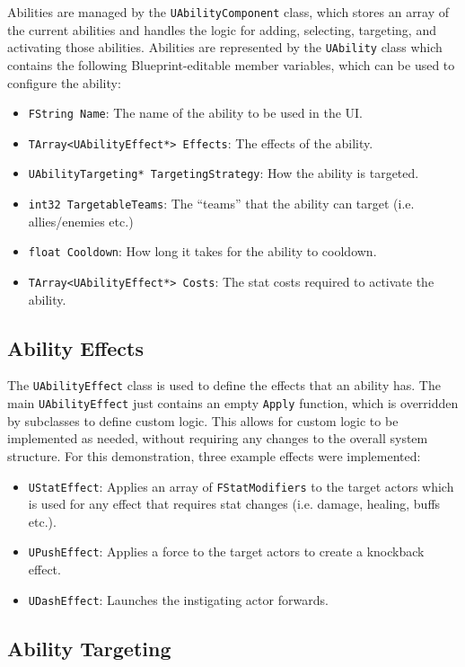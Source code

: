 \documentclass{article}
\begin{document}
Abilities are managed by the \texttt{UAbilityComponent} class, which stores an array of the current abilities and handles the logic for adding, selecting, targeting, and activating those abilities.
Abilities are represented by the \texttt{UAbility} class which contains the following Blueprint-editable member variables, which can be used to configure the ability:
\begin{itemize}
    \item \texttt{FString Name}: The name of the ability to be used in the UI.    
    \item \texttt{TArray<UAbilityEffect*> Effects}: The effects of the ability.
    \item \texttt{UAbilityTargeting* TargetingStrategy}: How the ability is targeted. 
    \item \texttt{int32 TargetableTeams}: The “teams” that the ability can target (i.e. allies/enemies etc.)
    \item \texttt{float Cooldown}: How long it takes for the ability to cooldown.
    \item \texttt{TArray<UAbilityEffect*> Costs}: The stat costs required to activate the ability.
\end{itemize}

\subsection{Ability Effects}

The \texttt{UAbilityEffect} class is used to define the effects that an ability has. The main \texttt{UAbilityEffect} just contains an empty \texttt{Apply} function, which is overridden by subclasses to define custom logic. This allows for custom logic to be implemented as needed, without requiring any changes to the overall system structure. 
For this demonstration, three example effects were implemented:
\begin{itemize}
    \item \texttt{UStatEffect}: Applies an array of \texttt{FStatModifiers} to the target actors which is used for any effect that requires stat changes (i.e. damage, healing, buffs etc.).
    \item \texttt{UPushEffect}: Applies a force to the target actors to create a knockback effect.
    \item \texttt{UDashEffect}: Launches the instigating actor forwards.
\end{itemize}

\subsection{Ability Targeting}
\end{document}
